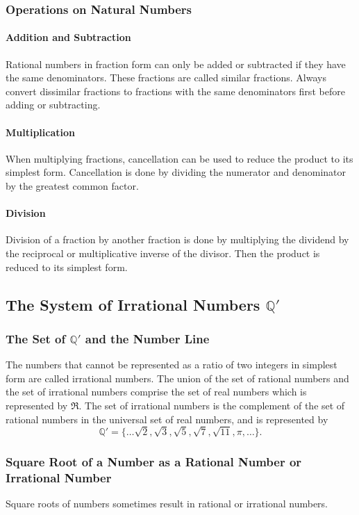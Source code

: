 \subsubsection*{Operations on Natural Numbers}
\paragraph*{Addition and Subtraction}
Rational numbers in fraction form can only be added or subtracted if they have the same
denominators. These fractions are called similar fractions. Always convert dissimilar fractions to
fractions with the same denominators first before adding or subtracting.

\paragraph*{Multiplication}
When multiplying fractions, cancellation can be used to reduce the product to its simplest
form. Cancellation is done by dividing the numerator and denominator by the greatest common
factor.

\paragraph*{Division}
Division of a fraction by another fraction is done by multiplying the dividend by the
reciprocal or multiplicative inverse of the divisor. Then the product is reduced to its simplest
form.

\subsection*{The System of Irrational Numbers $\mathbb{Q'}$}
\subsubsection*{The Set of $\mathbb{Q'}$ and the Number Line}
The numbers that cannot be represented as a ratio of two integers in simplest form are
called irrational numbers. The union of the set of rational numbers and the set of irrational
numbers comprise the set of real numbers which is represented by $\Re$. The set of irrational
numbers is the complement of the set of rational numbers in the universal set of real numbers,
and is represented by
\[\mathbb{Q'}=\{\ldots \sqrt{2},\sqrt{3},\sqrt{5},\sqrt{7},\sqrt{11},\pi,\ldots\}.\]

\subsubsection*{Square Root of a Number as a Rational Number or Irrational Number}
Square roots of numbers sometimes result in rational or irrational numbers.

